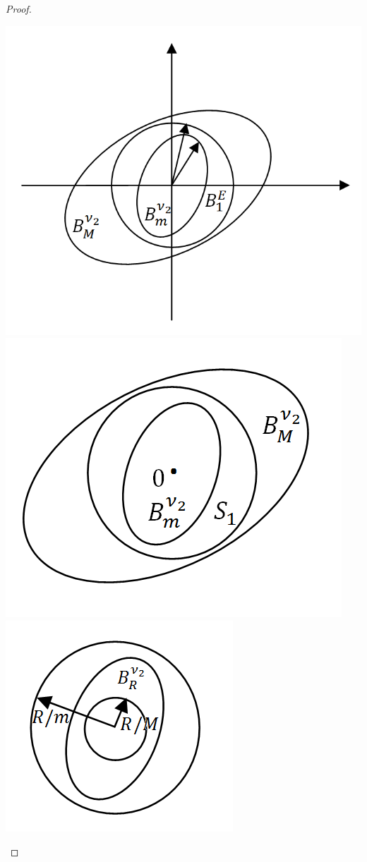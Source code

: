 \documentclass[12pt]{article}
\begin{document}
\begin{proof}
\begin{enumerate}
			\begin{center}\includegraphics[scale=0.55]{l5_7.png}\includegraphics[scale=0.55]{l5_9.png}\includegraphics[scale=0.65]{l5_8.png}\end{center}
			

\end{enumerate}
\end{proof}
\end{document}

